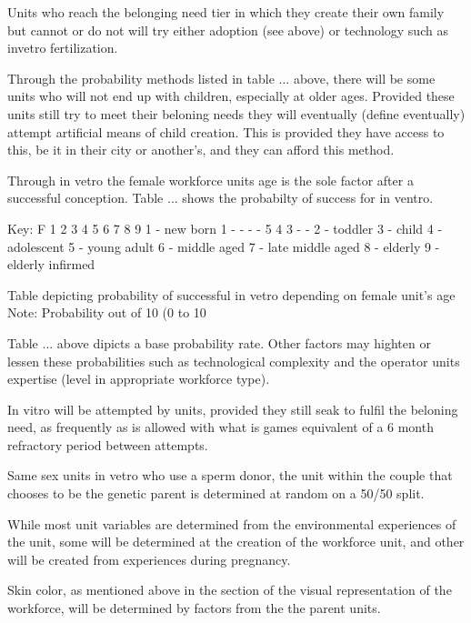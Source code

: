 



Units who reach the belonging need tier in which they create their own family but cannot or do not will try either adoption (see above) or technology such as invetro fertilization. 

Through the probability methods listed in table ... above, there will be some units who will not end up with children, especially at older ages. Provided these units still try to meet their beloning needs they will eventually (define eventually) attempt artificial means of child creation. This is provided they have access to this, be it in their city or another's, and they can afford this method.

Through in vetro the female workforce units age is the sole factor after a successful conception. Table ... shows the probabilty of success for in ventro.

			        Key:
F 1  2  3  4  5  6  7  8  9     1 - new born
1 -  -  -  -  5  4  3  -  -     2 - toddler
				3 - child
				4 - adolescent
				5 - young adult
				6 - middle aged
				7 - late middle aged
				8 - elderly 
				9 - elderly infirmed

Table depicting probability of successful in vetro depending on female unit's age
Note: Probability out of 10 (0 to 10

Table ... above dipicts a base probability rate. Other factors may highten or lessen these probabilities such as technological complexity and the operator units expertise (level in appropriate workforce type).

In vitro will be attempted by units, provided they still seak to fulfil the beloning need, as frequently as is allowed with what is games equivalent of a 6 month refractory period between attempts.

Same sex units in vetro who use a sperm donor, the unit within the couple that chooses to be the genetic parent is determined at random on a 50/50 split.


While most unit variables are determined from the environmental experiences of the unit, some will be determined at the creation of the workforce unit, and other will be created from experiences during pregnancy.

Skin color, as mentioned above in the section of the visual representation of the workforce, will be determined by factors from the the parent units.

